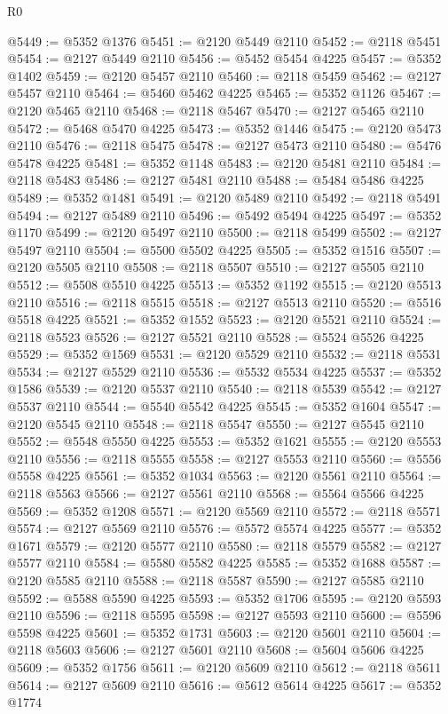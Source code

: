 \begin{lexlean}{R0}
\begin{coremodule}
@5449 := @5352 @1376
@5451 := @2120 @5449 @2110
@5452 := @2118 @5451
@5454 := @2127 @5449 @2110
@5456 := @5452 @5454 @4225
@5457 := @5352 @1402
@5459 := @2120 @5457 @2110
@5460 := @2118 @5459
@5462 := @2127 @5457 @2110
@5464 := @5460 @5462 @4225
@5465 := @5352 @1126
@5467 := @2120 @5465 @2110
@5468 := @2118 @5467
@5470 := @2127 @5465 @2110
@5472 := @5468 @5470 @4225
@5473 := @5352 @1446
@5475 := @2120 @5473 @2110
@5476 := @2118 @5475
@5478 := @2127 @5473 @2110
@5480 := @5476 @5478 @4225
@5481 := @5352 @1148
@5483 := @2120 @5481 @2110
@5484 := @2118 @5483
@5486 := @2127 @5481 @2110
@5488 := @5484 @5486 @4225
@5489 := @5352 @1481
@5491 := @2120 @5489 @2110
@5492 := @2118 @5491
@5494 := @2127 @5489 @2110
@5496 := @5492 @5494 @4225
@5497 := @5352 @1170
@5499 := @2120 @5497 @2110
@5500 := @2118 @5499
@5502 := @2127 @5497 @2110
@5504 := @5500 @5502 @4225
@5505 := @5352 @1516
@5507 := @2120 @5505 @2110
@5508 := @2118 @5507
@5510 := @2127 @5505 @2110
@5512 := @5508 @5510 @4225
@5513 := @5352 @1192
@5515 := @2120 @5513 @2110
@5516 := @2118 @5515
@5518 := @2127 @5513 @2110
@5520 := @5516 @5518 @4225
@5521 := @5352 @1552
@5523 := @2120 @5521 @2110
@5524 := @2118 @5523
@5526 := @2127 @5521 @2110
@5528 := @5524 @5526 @4225
@5529 := @5352 @1569
@5531 := @2120 @5529 @2110
@5532 := @2118 @5531
@5534 := @2127 @5529 @2110
@5536 := @5532 @5534 @4225
@5537 := @5352 @1586
@5539 := @2120 @5537 @2110
@5540 := @2118 @5539
@5542 := @2127 @5537 @2110
@5544 := @5540 @5542 @4225
@5545 := @5352 @1604
@5547 := @2120 @5545 @2110
@5548 := @2118 @5547
@5550 := @2127 @5545 @2110
@5552 := @5548 @5550 @4225
@5553 := @5352 @1621
@5555 := @2120 @5553 @2110
@5556 := @2118 @5555
@5558 := @2127 @5553 @2110
@5560 := @5556 @5558 @4225
@5561 := @5352 @1034
@5563 := @2120 @5561 @2110
@5564 := @2118 @5563
@5566 := @2127 @5561 @2110
@5568 := @5564 @5566 @4225
@5569 := @5352 @1208
@5571 := @2120 @5569 @2110
@5572 := @2118 @5571
@5574 := @2127 @5569 @2110
@5576 := @5572 @5574 @4225
@5577 := @5352 @1671
@5579 := @2120 @5577 @2110
@5580 := @2118 @5579
@5582 := @2127 @5577 @2110
@5584 := @5580 @5582 @4225
@5585 := @5352 @1688
@5587 := @2120 @5585 @2110
@5588 := @2118 @5587
@5590 := @2127 @5585 @2110
@5592 := @5588 @5590 @4225
@5593 := @5352 @1706
@5595 := @2120 @5593 @2110
@5596 := @2118 @5595
@5598 := @2127 @5593 @2110
@5600 := @5596 @5598 @4225
@5601 := @5352 @1731
@5603 := @2120 @5601 @2110
@5604 := @2118 @5603
@5606 := @2127 @5601 @2110
@5608 := @5604 @5606 @4225
@5609 := @5352 @1756
@5611 := @2120 @5609 @2110
@5612 := @2118 @5611
@5614 := @2127 @5609 @2110
@5616 := @5612 @5614 @4225
@5617 := @5352 @1774

\end{coremodule}
\end{lexlean}

